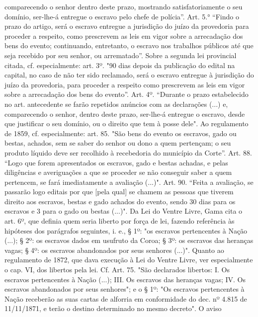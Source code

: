 {  comparecendo o senhor dentro deste prazo, mostrando satisfatoriamente
  o seu domínio, ser-lhe-á entregue o escravo pelo chefe de polícia''.
  Art. 5.° ``Findo o prazo do artigo, será o escravo entregue a
  jurisdição do juízo da provedoria para proceder a respeito, como
  prescrevem as leis em vigor sobre a arrecadação dos bens do evento;
  continuando, entretanto, o escravo nos trabalhos públicos até que seja
  recebido por seu senhor, ou arrematado''. Sobre a segunda lei
  provincial citada, cf. especialmente: art. 3º. "90 dias depois da
  publicação do edital na capital, no caso de não ter sido reclamado,
  será o escravo entregue à jurisdição do juízo da provedoria, para
  proceder a respeito como prescrevem as leis em vigor sobre a
  arrecadação dos bens do evento''. Art. 4º. ``Durante o prazo
  estabelecido no art. antecedente se farão repetidos anúncios com as
  declarações (...) e, comparecendo o senhor, dentro deste prazo,
  ser-lhe-á entregue o escravo, desde que justificar o seu domínio, ou o
  direito que tem à posse dele". Ao regulamento de 1859, cf.
  especialmente: art. 85. "São bens do evento os escravos, gado ou
  bestas, achados, sem se saber do senhor ou dono a quem pertençam; o
  seu produto líquido deve ser recolhido à recebedoria do município da
  Corte''. Art. 88. ``Logo que forem apresentados os escravos, gado e
  bestas achadas, e pelas diligências e averiguações a que se proceder
  se não conseguir saber a quem pertencem, se fará imediatamente a
  avaliação (...)". Art. 90. ``Feita a avaliação, se passarão logo
  editais por que {[}pela qual{]} se chamem as pessoas que tiverem
  direito aos escravos, bestas e gado achados do evento, sendo 30 dias
  para os escravos e 3 para o gado ou bestas (...)". Da Lei do Ventre
  Livre, Gama cita o art. 6º, que definia quem seria liberto por força
  de lei, fazendo referência às hipóteses dos parágrafos seguintes, i.
  e., § 1º: "os escravos pertencentes à Nação (...); § 2º: os escravos
  dados em usufruto da Coroa; § 3º: os escravos das heranças vagas; §
  4º: os escravos abandonados por seus senhores (...)". Quanto ao
  regulamento de 1872, que dava execução à Lei do Ventre Livre, ver
  especialmente o cap. VI, dos libertos pela lei. Cf. Art. 75. "São
  declarados libertos: I. Os escravos pertencentes à Nação (...); III.
  Os escravos das heranças vagas; IV. Os escravos abandonados por seus
  senhores"; e o § 1º: "Os escravos pertencentes à Nação receberão as
  suas cartas de alforria em conformidade do dec. nº 4.815 de
  11/11/1871, e terão o destino determinado no mesmo decreto". O aviso
}

